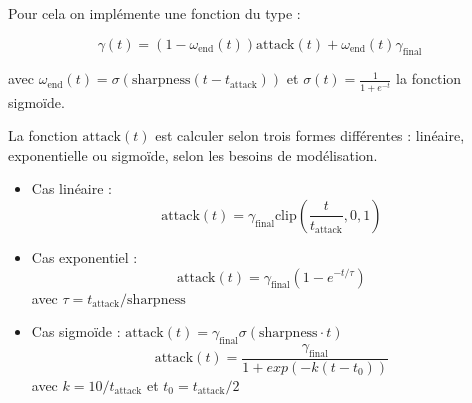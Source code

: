 \documentclass[12pt,a4paper]{article}
\begin{document}
Pour cela on implémente une fonction du type :

\begin{equation}
    \gamma(t) = (1-\omega_{\text{end}}(t))\text{attack}(t) + \omega_{\text{end}}(t)\gamma_{\text{final}}
\end{equation}

avec $\omega_{\text{end}}(t) = \sigma(\text{sharpness}(t-t_{\text{attack}}))$ et $\sigma(t)=\frac{1}{1+e^{-t}}$ la fonction sigmoïde. 

La fonction $\text{attack}(t)$ est calculer selon trois formes différentes : linéaire, exponentielle ou sigmoïde, selon les besoins de modélisation.

\begin{itemize}
    \item Cas linéaire : 
    \begin{equation}
        \text{attack}(t) = \gamma_{\text{final}} \text{clip}(\frac{t}{t_{\text{attack}}}, 0, 1)
    \end{equation}
    \item Cas exponentiel : 
    \begin{equation}
        \text{attack}(t) = \gamma_{\text{final}} (1 - e^{- t / \tau})
    \end{equation}
    avec $\tau = t_{\text{attack}} / \text{sharpness}$
    \item Cas sigmoïde : $\text{attack}(t) = \gamma_{\text{final}} \sigma(\text{sharpness} \cdot t)$
    \begin{equation}
        \text{attack}(t) = \frac{\gamma_{\text{final}}}{1+exp(-k(t-t_0))}
    \end{equation}
    avec $k=10/t_{\text{attack}}$ et $t_0= t_{\text{attack}}/2$
\end{itemize}
\end{document}
